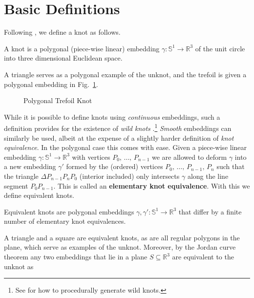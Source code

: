 \section{Basic Definitions}
    Following \cite[p.~15]{LivingstonKnotTheory}, we define a knot as follows.
    \begin{definition}
        A knot is a polygonal (piece-wise linear) embedding
        $\gamma:\mathbb{S}^{1}\rightarrow\mathbb{R}^{3}$ of the unit circle
        into three dimensional Euclidean space.
    \end{definition}
    A triangle serves as a polygonal example of the unknot, and the trefoil is
    given a polygonal embedding in Fig.~\ref{fig:trefoil_knot_polygonal}.
    \begin{figure}
        \centering
        \caption{Polygonal Trefoil Knot}
        \label{fig:trefoil_knot_polygonal}
    \end{figure}
    While it is possible to define knots using \textit{continuous} embeddings,
    such a definition provides for the existence of
    \textit{wild knots} \cite{FoxArtinWildKnots1948}.\footnote{%
        See \cite{BrowneWildKnots} for how to procedurally generate wild knots.
    }
    \textit{Smooth} embeddings can similarly be used, albeit at the expense of
    a slightly harder definition of \textit{knot equivalence}. In the polygonal
    case this comes with ease. Given a piece-wise linear embedding
    $\gamma:\mathbb{S}^{1}\rightarrow\mathbb{R}^{3}$ with vertices
    $P_{0},\,\dots,\,P_{n-1}$ we are allowed to deform $\gamma$ into a new
    embedding $\gamma'$ formed by the (ordered) vertices
    $P_{0},\,\dots,\,P_{n-1},\,P_{n}$
    such that the triangle $\Delta{P}_{n-1}P_{n}P_{0}$ (interior included)
    only intersects $\gamma$
    along the line segment $P_{0}P_{n-1}$. This is called an
    \textbf{elementary knot equivalence}. With this we define equivalent knots.
    \begin{definition}
        Equivalent knots are polygonal embeddings
        $\gamma,\gamma':\mathbb{S}^{1}\rightarrow\mathbb{R}^{3}$ that differ by
        a finite number of elementary knot equivalences.
    \end{definition}
    A triangle and a square are equivalent knots, as are all regular
    polygons in the plane, which serve as examples of the unknot.
    Moreover, by the Jordan curve theorem any two embeddings that
    lie in a plane $S\subseteq\mathbb{R}^{3}$ are equivalent to the unknot as
